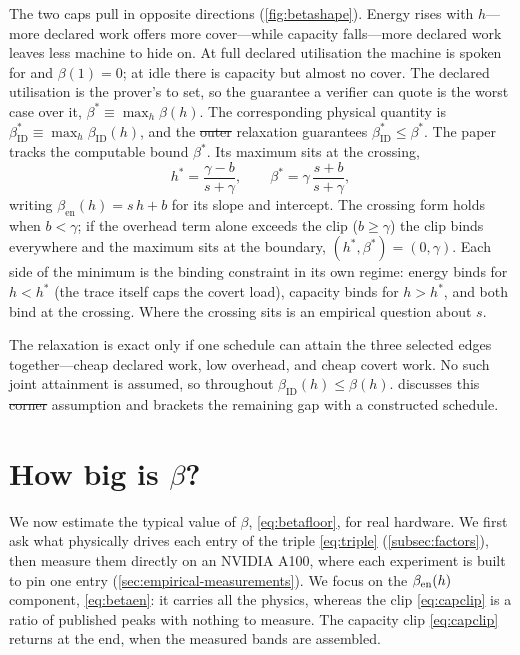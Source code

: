 \documentclass{article}
\makeatletter
\theoremstyle{plain}
\theoremstyle{definition}
\theoremstyle{remark}
\providecommand{\DIFaddtex}[1]{{\protect\color{blue}\uwave{#1}}} %
\providecommand{\DIFdeltex}[1]{{\protect\color{red}\sout{#1}}} %
\providecommand{\DIFaddbegin}{} %
\providecommand{\DIFaddend}{} %
\providecommand{\DIFdelbegin}{} %
\providecommand{\DIFdelend}{} %
\providecommand{\DIFadd}[1]{\texorpdfstring{\DIFaddtex{#1}}{#1}} %
\providecommand{\DIFdel}[1]{\texorpdfstring{\DIFdeltex{#1}}{}} %
\providecommand{\DIFscaledelfig}{0.5}
\newlength{\DIFdelgraphicswidth} %
\newlength{\DIFdelgraphicsheight} %
\providecommand{\DIFaddincludegraphics}[2][]{{\color{blue}\fbox{\DIFOincludegraphics[#1]{#2}}}} %
\providecommand{\DIFdelincludegraphics}[2][]{%
\sbox{\DIFdelgraphicsbox}{\DIFOincludegraphics[#1]{#2}}%
\settoboxwidth{\DIFdelgraphicswidth}{\DIFdelgraphicsbox} %
\settoboxtotalheight{\DIFdelgraphicsheight}{\DIFdelgraphicsbox} %
\scalebox{\DIFscaledelfig}{%
\parbox[b]{\DIFdelgraphicswidth}{\usebox{\DIFdelgraphicsbox}\\[-\baselineskip] \rule{\DIFdelgraphicswidth}{0em}}\llap{\resizebox{\DIFdelgraphicswidth}{\DIFdelgraphicsheight}{%
\setlength{\unitlength}{\DIFdelgraphicswidth}%
\begin{picture}(1,1)%
\thicklines\linethickness{2pt} %
{\color[rgb]{1,0,0}\put(0,0){\framebox(1,1){}}}%
{\color[rgb]{1,0,0}\put(0,0){\line( 1,1){1}}}%
{\color[rgb]{1,0,0}\put(0,1){\line(1,-1){1}}}%
\end{picture}%
}\hspace*{3pt}}} %
} %
\DeclareRobustCommand{\DIFaddbegin}{\DIFOaddbegin \let\includegraphics\DIFaddincludegraphics} %
\DeclareRobustCommand{\DIFaddend}{\DIFOaddend \let\includegraphics\DIFOincludegraphics} %
\DeclareRobustCommand{\DIFdelbegin}{\DIFOdelbegin \let\includegraphics\DIFdelincludegraphics} %
\DeclareRobustCommand{\DIFdelend}{\DIFOaddend \let\includegraphics\DIFOincludegraphics} %
\let\sout@orig\sout %
\renewcommand{\sout}[1]{\ifmmode\text{\sout@orig{\ensuremath{#1}}}\else\sout@orig{#1}\fi} %
\makeatother
\begin{document}
The two caps pull in opposite directions (\cref{fig:betashape}). Energy
rises with $h$---more declared work offers more cover---while capacity
falls---more
declared work leaves less machine to hide on. At full declared utilisation
the machine is spoken for and $\beta(1) = 0$; at idle there
is capacity but almost no cover. The declared utilisation is the prover's to
set, so the guarantee a verifier can quote is the worst case over it,
$\beta^{*} \equiv \max_h \beta(h)$. The corresponding physical quantity is
$\beta_{\mathrm{ID}}^{*} \equiv \max_h \beta_{\mathrm{ID}}(h)$, and the
\DIFdelbegin \DIFdel{outer }\DIFdelend relaxation guarantees $\beta_{\mathrm{ID}}^{*} \leq \beta^{*}$.
The paper tracks the computable bound $\beta^{*}$. Its maximum sits at the crossing,
\begin{equation}
	h^{*} = \frac{\gamma - b}{s + \gamma}, \qquad
	\beta^{*} = \gamma\,\frac{s + b}{s + \gamma},
	\label{eq:betaworst}
\end{equation}
writing $\beta_{\mathrm{en}}(h) = s\,h + b$ for its slope and intercept. The crossing form
holds when $b < \gamma$; if the overhead term alone exceeds the clip
($b \ge \gamma$) the clip binds everywhere and the maximum sits at the
boundary, $(h^{*}, \beta^{*}) = (0, \gamma)$. Each side of the
minimum is the binding constraint in its own regime: energy binds for
$h < h^{*}$ (the trace itself caps the covert load), capacity binds for
$h > h^{*}$, and both bind at the crossing. Where the crossing sits is an
empirical question about $s$.

The relaxation is exact only if one schedule can attain the three selected
edges together---cheap declared work, low overhead, and cheap covert work.
No such joint attainment is assumed, so throughout
$\beta_{\mathrm{ID}}(h) \leq \beta(h)$.  discusses this
\DIFdelbegin \DIFdel{corner }\DIFdelend \DIFaddbegin \DIFadd{joint-attainment }\DIFaddend assumption and brackets the remaining gap with a constructed schedule.

\section{How big is \texorpdfstring{$\beta$}{beta}?}
\label{sec:howbig}

We now estimate the typical value of $\beta$, \cref{eq:betafloor}, for real hardware. We first ask what physically drives each entry of the triple \cref{eq:triple}
(\cref{subsec:factors}), then measure them directly on an NVIDIA A100, where
each experiment is built to pin one entry
(\cref{sec:empirical-measurements}). We focus on the $\beta_{\rm en}(h)$ component, \cref{eq:betaen}: it carries all
the physics, whereas the clip \cref{eq:capclip} is a ratio of published peaks
with nothing to measure. The capacity clip \cref{eq:capclip}
returns at the end, when the measured bands are assembled.
\end{document}
